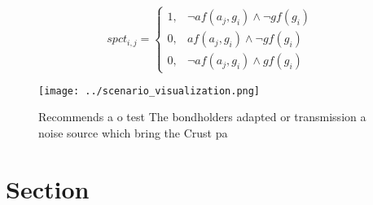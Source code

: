 \documentclass[a4paper]{article}
\begin{document}
\begin{equation}
spct_{i,j} =
\begin{cases}
1, & \text{$\neg af(a_j,g_i) \wedge \neg gf(g_i)$}\\
0, & \text{$af(a_j,g_i) \wedge \neg gf(g_i)$}\\
0, & \text{$\neg af(a_j,g_i) \wedge gf(g_i)$}
\end{cases}
\end{equation}

\begin{figure}
\centering
\texttt{[image: ../scenario\_visualization.png]}
\caption{Recommends a o test The bondholders adapted or transmission a noise source which bring the Crust pa
}
\end{figure}
 
\section{Section}
\end{document}
